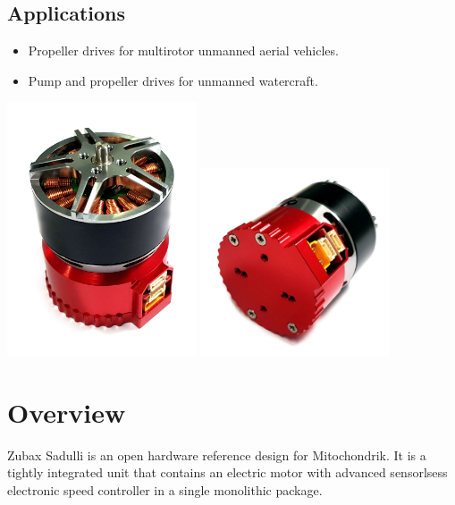 \documentclass{zubaxdoc}
\begin{document}
\begin{titlepage}
\section*{Applications}

\begin{itemize}
    \item Propeller drives for multirotor unmanned aerial vehicles.
    \item Pump and propeller drives for unmanned watercraft.
\end{itemize}
\centering
\includegraphics[width=0.42\textwidth]{sadulli-top}
\includegraphics[width=0.42\textwidth]{sadulli-bottom}
\end{titlepage}

\tableofcontents
\BeginRightColumn
\listoffigures
\listoftables

\mainmatter

\chapter{Overview}
Zubax Sadulli is an open hardware reference design for Mitochondrik. It is a tightly integrated unit that contains an electric motor with advanced sensorlsess electronic speed controller in a single monolithic package. 
\end{document}
